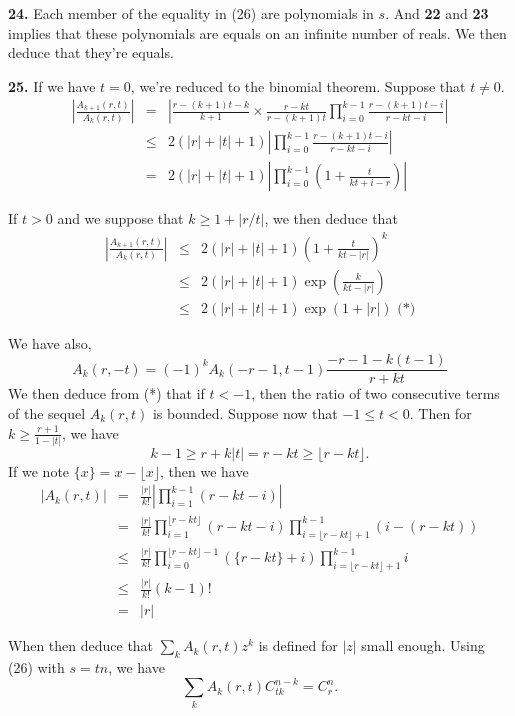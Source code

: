 \documentclass[a4paper,12pt]{article}
\newcommand{\newpar}[1]{\bigskip \noindent \textbf{#1.}}
\begin{document}
\newpar{24} Each member of the equality in (26) are polynomials in
$s$.  And \textbf{22} and \textbf{23} implies that these polynomials
are equals on an infinite number of reals.  We then deduce that
they're equals.

\newpar{25} If we have $t=0$, we're reduced to the binomial theorem.
Suppose that $t \not= 0$.
\begin{eqnarray*}
  \left| \frac{A_{k+1}(r,t)}{A_k(r,t)} \right| &=&
  \left| \frac{r-(k+1)t - k}{k+1}\times \frac{r-kt}{r-(k+1)t} \prod_{i=0}^{k-1}
  \frac{r - (k+1)t - i}{r - kt - i}\right| \\
  &\le& 2(|r|+|t|+1) \left| \prod_{i=0}^{k-1} \frac{r - (k+1)t - i}{r - kt
    - i}\right| \\
  &=& 2(|r|+|t|+1) \left| \prod_{i=0}^{k-1}\left( 1 +
  \frac{t}{kt+i-r}\right)\right|
\end{eqnarray*}

If $t > 0$ and we suppose that $k \ge 1 + |r/t|$, we then deduce that
\begin{eqnarray*}
  \left| \frac{A_{k+1}(r,t)}{A_k(r,t)}\right| &\le& 2(|r|+|t|+1)
  \left(1 + \frac{t}{kt-|r|}\right)^k \\
  &\le& 2(|r|+|t|+1) \exp\left(\frac{k}{kt-|r|}\right) \\
  &\le& 2(|r|+|t|+1) \exp(1 + |r|) \mbox{ (*)}
\end{eqnarray*}

We have also,
\[ A_k(r,-t) = (-1)^k A_k(-r-1,t-1) \frac{-r-1-k(t-1)}{r+kt}\]
We then deduce from (*) that if $t < -1$, then the ratio of two
consecutive terms of the sequel $A_k(r,t)$ is bounded.  Suppose now
that $-1 \le t < 0$. Then for $k \ge \frac{r+1}{1-|t|}$, we have
\[ k-1 \ge r+k|t| = r-kt \ge \lfloor r-kt\rfloor.\]
If we note $\{x\} = x - \lfloor x\rfloor$, then we have
\begin{eqnarray*}
  |A_k(r,t)| &=& \frac{|r|}{k!} \left| \prod_{i=1}^{k-1} (r-kt -i)
  \right| \\
  &=&  \frac{|r|}{k!} \prod_{i=1}^{\lfloor r-kt\rfloor}(r-kt -i)
  \prod_{i=\lfloor r-kt\rfloor + 1}^{k-1}(i-(r-kt)) \\
  &\le& \frac{|r|}{k!} \prod_{i=0}^{\lfloor r-kt\rfloor-1}(\{r-kt\} +
  i) \prod_{i=\lfloor r-kt\rfloor +1}^{k-1} i \\
  &\le& \frac{|r|}{k!} (k-1)! \\
  &=& |r|
\end{eqnarray*}

When then deduce that $\sum_k A_k(r,t) z^k$ is defined for $|z|$ small
enough.  Using (26) with $s = tn$, we have
\[ \sum_k A_k(r,t) C_{tk}^{n-k} = C_r^n.\]
\end{document}

